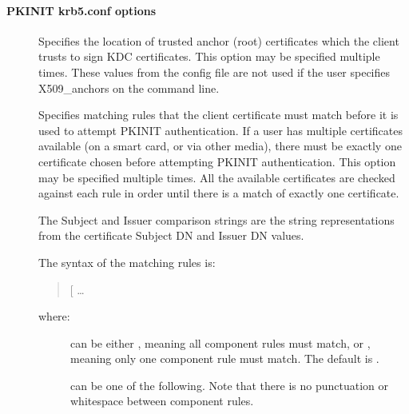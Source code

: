 \documentclass[letterpaper,10pt,english]{sphinxmanual}
\begin{document}
\paragraph{PKINIT krb5.conf options}
\label{\detokenize{admin/conf_files/krb5_conf:pkinit-krb5-conf-options}}\begin{description}
\item[{}] \leavevmode
\sphinxAtStartPar
Specifies the location of trusted anchor (root) certificates which
the client trusts to sign KDC certificates.  This option may be
specified multiple times.  These values from the config file are
not used if the user specifies X509\_anchors on the command line.

\item[{}] \leavevmode
\sphinxAtStartPar
Specifies matching rules that the client certificate must match
before it is used to attempt PKINIT authentication.  If a user has
multiple certificates available (on a smart card, or via other
media), there must be exactly one certificate chosen before
attempting PKINIT authentication.  This option may be specified
multiple times.  All the available certificates are checked
against each rule in order until there is a match of exactly one
certificate.

\sphinxAtStartPar
The Subject and Issuer comparison strings are the 
string representations from the certificate Subject DN and Issuer
DN values.

\sphinxAtStartPar
The syntax of the matching rules is:
\begin{quote}

\sphinxAtStartPar
{[}\sphinxstyleemphasis{relation\sphinxhyphen{}operator}{]} …
\end{quote}

\sphinxAtStartPar
where:
\begin{description}
\item[{}] \leavevmode
\sphinxAtStartPar
can be either \sphinxcode{\sphinxupquote{\&\&}}, meaning all component rules must match,
or \sphinxcode{\sphinxupquote{||}}, meaning only one component rule must match.  The
default is \sphinxcode{\sphinxupquote{\&\&}}.

\item[{}] \leavevmode
\sphinxAtStartPar
can be one of the following.  Note that there is no
punctuation or whitespace between component rules.
\begin{quote}


\end{quote}
\end{description}
\end{description}
\end{document}
